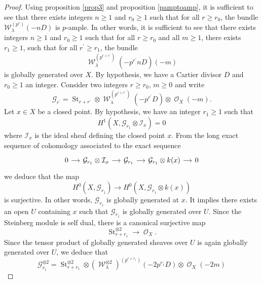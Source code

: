 \documentclass[11pt]{amsart}
\numberwithin{subsection}{section}
\numberwithin{figure}{section}
\numberwithin{table}{section}
\theoremstyle{1}
\theoremstyle{2}
\DeclareMathOperator{\St}{St}
\DeclareMathOperator{\Oc}{\mathcal{O}}
\DeclareMathOperator{\W}{\mathcal{W}}
\begin{document}
\begin{proof}
Using proposition \ref{prop3} and proposition \ref{pamptoamp}, it is sufficient to see that there exists integers $n \geq 1$ and $r_ 0 \geq 1$ such that for all $r \geq r_0$, the bundle $\mathcal{W}_{\lambda}^{(p^r)}(-nD)$ is $p$-ample. In other words, it is sufficient to see that there exists integers $n \geq 1$ and $r_ 0 \geq 1$ such that for all $r \geq r_0$ and all $m\geq 1$, there exists $r_1 \geq 1$, such that for all $r^\prime \geq r_1$, the bundle $$\W_{\lambda}^{(p^{r+r^\prime})}(-p^{r^\prime}nD)(-m)$$ is globally generated over $X$. By hypothesis, we have a Cartier divisor $D$ and $r_ 0 \geq 1$ an integer. Consider two integers $r \geq r_0$, $m\geq 0$ and write $$\mathcal{G}_{r^\prime} =  \St_{r+r^\prime} \otimes \W_{\lambda}^{(p^{r+r^\prime})}(-p^{r^\prime}D) \otimes \Oc_X(-m).$$Let $x \in X$ be a closed point. By hypothesis, we have an integer $r_1 \geq 1$ such that 
\begin{equation*}
H^1(X, \mathcal{G}_{r_1} \otimes \mathcal{I}_x) = 0
\end{equation*}
where $\mathcal{I}_x$ is the ideal sheaf defining the closed point $x$. From the long exact sequence of cohomology associated to the exact sequence 
\begin{equation*}
\begin{tikzcd}[column sep = small]
0 \arrow[r] & \mathcal{G}_{r_1}\otimes \mathcal{I}_x \arrow[r] & \mathcal{G}_{r_1} \arrow[r] & \mathcal{G}_{r_1} \otimes k(x) \arrow[r] & 0
\end{tikzcd}
\end{equation*}
we deduce that the map
\begin{equation*}
H^0(X,\mathcal{G}_{r_1}) \rightarrow H^0(X,\mathcal{G}_{r_1}\otimes k(x))
\end{equation*}
is surjective. In other words, $\mathcal{G}_{r_1}$ is globally generated at $x$. It implies there exists an open $U$ containing $x$ such that $\mathcal{G}_{r_1}$ is globally generated over $U$. Since the Steinberg module is self dual, there is a canonical surjective map
\begin{equation*}
\St_{r+r_1}^{\otimes 2} \rightarrow \Oc_X.
\end{equation*}
Since the tensor product of globally generated sheaves over $U$ is again globally generated over $U$, we deduce that 
\begin{equation*}
\mathcal{G}_{r_1}^{\otimes 2} = \St_{r+r_1}^{\otimes 2} \otimes {(\W_{\lambda}^{\otimes 2})}^{(p^{r+r_1})}(-2p^{r_1}D) \otimes \Oc_X(-2m)
\end{equation*}

\end{proof}
\end{document}
